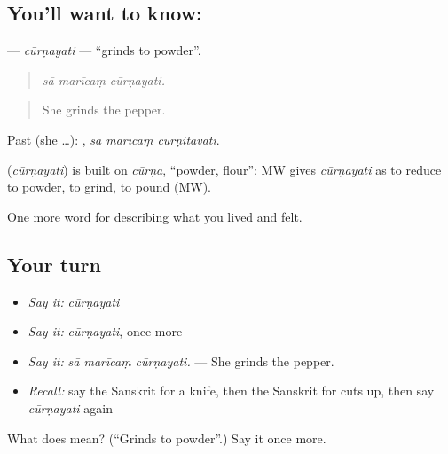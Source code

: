 \subsection*{You'll want to know: }
\textbf{} — \emph{cūrṇayati} — \textquotedblleft{}grinds to powder\textquotedblright{}.

\begin{quote}
  
\end{quote}

\begin{quote}
\emph{sā marīcaṃ cūrṇayati.}
\end{quote}

\begin{quote}
She grinds the pepper.
\end{quote}

Past (she …):   , \emph{sā marīcaṃ cūrṇitavatī}.

\begin{cousinweb}
\textbf{} (\emph{cūrṇayati}) is built on \emph{cūrṇa}, \textquotedblleft{}powder, flour\textquotedblright{}: MW gives \emph{cūrṇayati} as to reduce to powder, to grind, to pound (MW).
\end{cousinweb}

\begin{grammarlens}[title={What you've built}]
One more word for describing what you lived and felt.
\end{grammarlens}

\subsection*{Your turn}
\begin{itemize}
\raggedright
  \item \emph{Say it:} \emph{cūrṇayati}
  \item \emph{Say it:} \emph{cūrṇayati}, once more
  \item \emph{Say it:} \emph{sā marīcaṃ cūrṇayati.} — She grinds the pepper.
  \item \emph{Recall:} say the Sanskrit for a knife, then the Sanskrit for cuts up, then say \emph{cūrṇayati} again
\end{itemize}

\begin{tcolorbox}[breakable,colback=teal!4,colframe=teal!35!black,title={Before you move on}]
What does  mean? (\textquotedblleft{}Grinds to powder\textquotedblright{}.) Say it once more.
\end{tcolorbox}
